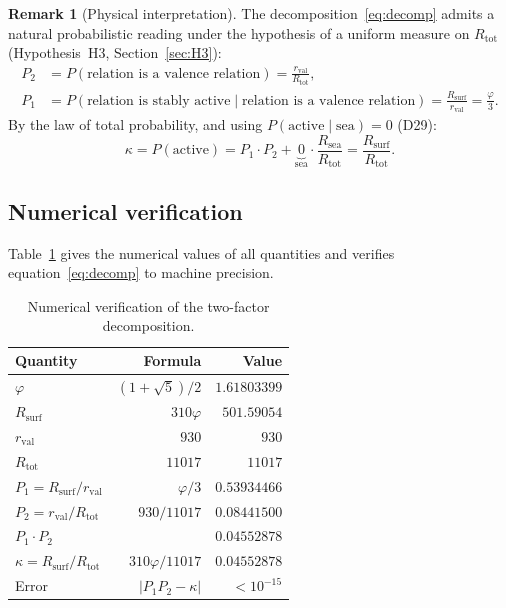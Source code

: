 \documentclass[11pt,a4paper]{article}
\theoremstyle{definition}
\newtheorem{remark}[theorem]{Remark}
\newcommand{\rval}{r_{\mathrm{val}}}
\newcommand{\Rsea}{R_{\mathrm{sea}}}
\newcommand{\Rtot}{R_{\mathrm{tot}}}
\newcommand{\Rsurf}{R_{\mathrm{surf}}}
\newcommand{\vp}{\varphi}
\newcommand{\kap}{\kappa}
\begin{document}
\begin{remark}[Physical interpretation]
The decomposition~\eqref{eq:decomp} admits a natural probabilistic
reading under the hypothesis of a uniform measure on $\Rtot$
(Hypothesis~H3, Section~\ref{sec:H3}):
\begin{align}
P_2 &= P(\text{relation is a valence relation})
= \frac{\rval}{\Rtot}, \label{eq:P2} \\
P_1 &= P(\text{relation is stably active} \mid
\text{relation is a valence relation})
= \frac{\Rsurf}{\rval} = \frac{\vp}{3}. \label{eq:P1}
\end{align}
By the law of total probability, and using
$P(\text{active} \mid \text{sea}) = 0$ (D29):
\begin{equation}
\kap = P(\text{active}) = P_1 \cdot P_2
+ \underbrace{0}_{\text{sea}} \cdot \frac{\Rsea}{\Rtot}
= \frac{\Rsurf}{\Rtot}.
\label{eq:total_prob}
\end{equation}
\end{remark}

\subsection{Numerical verification}

Table~\ref{tab:decomp} gives the numerical values of all quantities
and verifies equation~\eqref{eq:decomp} to machine precision.

\begin{table}[ht]
\centering
\caption{Numerical verification of the two-factor decomposition.}
\label{tab:decomp}
\medskip
\begin{tabular}{lrr}
\toprule
Quantity & Formula & Value \\
\midrule
$\vp$ & $(1+\sqrt{5})/2$ & $1.61803399$ \\
$\Rsurf$ & $310\vp$ & $501.59054$ \\
$\rval$ & $930$ & $930$ \\
$\Rtot$ & $11017$ & $11017$ \\
$P_1 = \Rsurf/\rval$ & $\vp/3$ & $0.53934466$ \\
$P_2 = \rval/\Rtot$ & $930/11017$ & $0.08441500$ \\
$P_1 \cdot P_2$ & & $0.04552878$ \\
$\kap = \Rsurf/\Rtot$ & $310\vp/11017$ & $0.04552878$ \\
Error & $|P_1 P_2 - \kap|$ & $< 10^{-15}$ \\
\bottomrule
\end{tabular}
\end{table}
\end{document}
